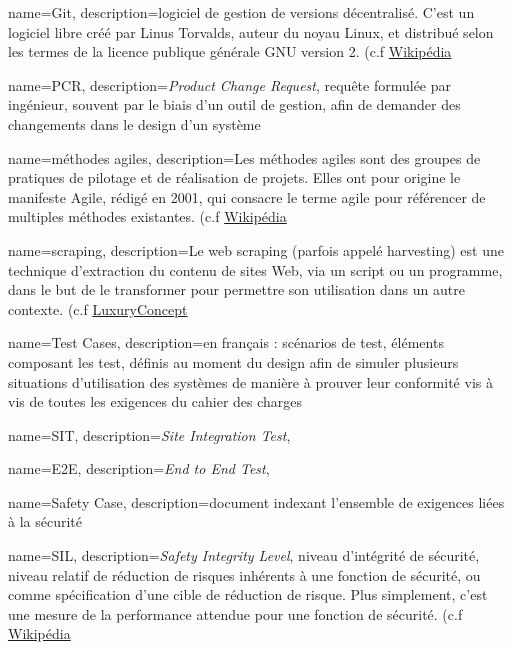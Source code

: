 {
	name=Git,
	description={logiciel de gestion de versions décentralisé. C'est un logiciel libre créé par Linus Torvalds, auteur du noyau Linux, et distribué selon les termes de la licence publique générale GNU version 2.  (c.f \href{https://fr.wikipedia.org/wiki/Git}{Wikipédia}}
}

{
	name=PCR,
	description={\textit{Product Change Request}, requête formulée par ingénieur, souvent par le biais d'un outil de gestion, afin de demander des changements dans le design d'un système}
}

{
	name=méthodes agiles,
	description={Les méthodes agiles sont des groupes de pratiques de pilotage et de réalisation de projets. Elles ont pour origine le manifeste Agile, rédigé en 2001, qui consacre le terme agile pour référencer de multiples méthodes existantes. (c.f \href{https://fr.wikipedia.org/wiki/Méthode_agile}{Wikipédia}}
}

{
	name=scraping,
	description={Le web scraping (parfois appelé harvesting) est une technique d'extraction du contenu de sites Web, via un script ou un programme, dans le but de le transformer pour permettre son utilisation dans un autre contexte. (c.f \href{https://www.luxury-concept.com/dev-blog/346-le-scaping-des-donnees-pourquoi-et-comment.html}{LuxuryConcept}}
}

{
	name=Test Cases,
	description={en français : scénarios de test, éléments composant les test, définis au moment du design afin de simuler plusieurs situations d'utilisation des systèmes de manière à prouver leur conformité vis à vis de toutes les exigences du cahier des charges}
	}

{
	name=SIT,
	description={\textit{Site Integration Test},  }
	}	
	
{
	name=E2E,
	description={\textit{End to End Test},  }
	}

{
	name=Safety Case,
	description={document indexant l'ensemble de exigences liées à la sécurité}
	}
	
{
	name=SIL,
	description={\textit{Safety Integrity Level}, niveau d'intégrité de sécurité, niveau relatif de réduction de risques inhérents à une fonction de sécurité, ou comme spécification d'une cible de réduction de risque. Plus simplement, c'est une mesure de la performance attendue pour une fonction de sécurité. (c.f \href{https://fr.wikipedia.org/wiki/Safety_Integrity_Level}{Wikipédia}}
}

\glsaddall

